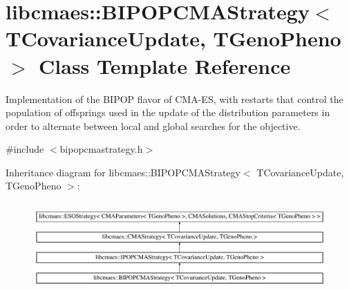 \hypertarget{classlibcmaes_1_1BIPOPCMAStrategy}{\section{libcmaes\-:\-:B\-I\-P\-O\-P\-C\-M\-A\-Strategy$<$ T\-Covariance\-Update, T\-Geno\-Pheno $>$ Class Template Reference}
\label{classlibcmaes_1_1BIPOPCMAStrategy}
}


Implementation of the B\-I\-P\-O\-P flavor of C\-M\-A-\/\-E\-S, with restarts that control the population of offsprings used in the update of the distribution parameters in order to alternate between local and global searches for the objective.  




{\ttfamily \#include $<$bipopcmastrategy.\-h$>$}

Inheritance diagram for libcmaes\-:\-:B\-I\-P\-O\-P\-C\-M\-A\-Strategy$<$ T\-Covariance\-Update, T\-Geno\-Pheno $>$\-:\begin{figure}[H]
\begin{center}
\leavevmode
\includegraphics[height=3.430321cm]{classlibcmaes_1_1BIPOPCMAStrategy}
\end{center}
\end{figure}
